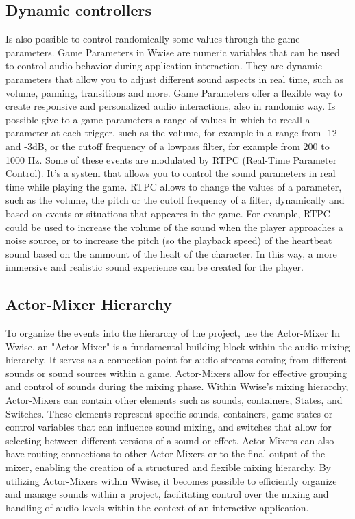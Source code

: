 	\subsection{Dynamic controllers}
	Is also possible to control randomically some values through the game parameters.
	Game Parameters in Wwise are numeric variables that can be used to control audio behavior during application interaction. They are dynamic parameters that allow you to adjust different sound aspects in real time, such as volume, panning, transitions and more. Game Parameters offer a flexible way to create responsive and personalized audio interactions, also in randomic way. Is possible give to a game parameters a range of values in which to recall a parameter at each trigger, such as the volume, for example in a range from -12 and -3dB, or the cutoff frequency of a lowpass filter, for example from 200 to 1000 Hz.
	Some of these events are modulated by RTPC (Real-Time Parameter Control). It's a system that allows you to control the sound parameters in real time while playing the game.
	RTPC allows to change the values of a parameter, such as the volume, the pitch or the cutoff frequency of a filter, dynamically and based on events or situations that appeares in the game. For example, RTPC could be used to increase the volume of the sound when the player approaches a noise source, or to increase the pitch (so the playback speed) of the heartbeat sound based on the ammount of the healt of the character. In this way, a more immersive and realistic sound experience can be created for the player.
	
	\subsection{Actor-Mixer Hierarchy}
	To organize the events into the hierarchy of the project, use the Actor-Mixer
	In Wwise, an "Actor-Mixer" is a fundamental building block within the audio mixing hierarchy. It serves as a connection point for audio streams coming from different sounds or sound sources within a game. Actor-Mixers allow for effective grouping and control of sounds during the mixing phase.
	Within Wwise's mixing hierarchy, Actor-Mixers can contain other elements such as sounds, containers, States, and Switches. These elements represent specific sounds, containers, game states or control variables that can influence sound mixing, and switches that allow for selecting between different versions of a sound or effect.
	Actor-Mixers can also have routing connections to other Actor-Mixers or to the final output of the mixer, enabling the creation of a structured and flexible mixing hierarchy.
	By utilizing Actor-Mixers within Wwise, it becomes possible to efficiently organize and manage sounds within a project, facilitating control over the mixing and handling of audio levels within the context of an interactive application.
	
